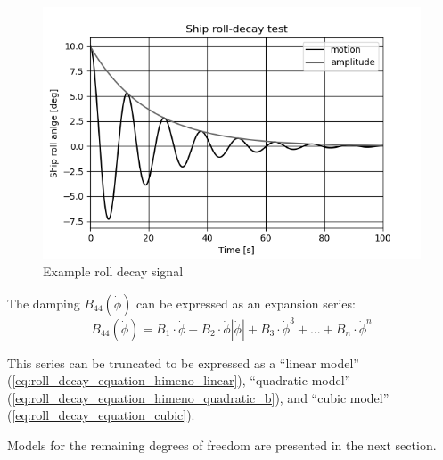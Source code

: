 \begin{figure}[H]
    \centering
    \includegraphics[width=\linewidth]{kappa/images/roll-decay.png}
    \caption{Example roll decay signal}
    \label{fig:rolldecay}
\end{figure}

\noindent The damping $B_{44}\left(\dot{\phi}\right)$ can be expressed as an expansion series:  
\begin{equation}
    B_{44}\left(\dot{\phi}\right) = B_1\cdot\dot{\phi} + B_2\cdot\dot{\phi}\left|\dot{\phi}\right| + B_3\cdot\dot{\phi}^3 + ... + B_n\cdot\dot{\phi}^n
\end{equation}
 
\noindent This series can be truncated to be expressed as a ``linear model'' (\autoref{eq:roll_decay_equation_himeno_linear}), ``quadratic model'' (\autoref{eq:roll_decay_equation_himeno_quadratic_b}), and ``cubic model'' (\autoref{eq:roll_decay_equation_cubic}).




Models for the remaining degrees of freedom are presented in the next section.


